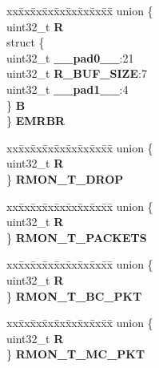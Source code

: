 \begin{DoxyCompactItemize}
\begin{tabbing}
\end{tabbing}\item 
\mbox{\label{structFEC__tag_a793aa6e26c1764363fe55c0d1cafb45c}} 
\begin{tabbing}
xx\=xx\=xx\=xx\=xx\=xx\=xx\=xx\=xx\=\kill
union \{\\
\>uint32\_t {\bfseries R}\\
\>struct \{\\
\>\>uint32\_t {\bfseries \_\_pad0\_\_}:21\\
\>\>uint32\_t {\bfseries R\_BUF\_SIZE}:7\\
\>\>uint32\_t {\bfseries \_\_pad1\_\_}:4\\
\>\} {\bfseries B}\\
\} {\bfseries EMRBR}\\

\end{tabbing}\item 
\mbox{\label{structFEC__tag_ac0c74b31f003377594c2c484a718315f}} 
\begin{tabbing}
xx\=xx\=xx\=xx\=xx\=xx\=xx\=xx\=xx\=\kill
union \{\\
\>uint32\_t {\bfseries R}\\
\} {\bfseries RMON\_T\_DROP}\\

\end{tabbing}\item 
\mbox{\label{structFEC__tag_a41cbe14c0586dc01889280dc240ae2cc}} 
\begin{tabbing}
xx\=xx\=xx\=xx\=xx\=xx\=xx\=xx\=xx\=\kill
union \{\\
\>uint32\_t {\bfseries R}\\
\} {\bfseries RMON\_T\_PACKETS}\\

\end{tabbing}\item 
\mbox{\label{structFEC__tag_a06baf6ffb8bff449b7af48b806d427b1}} 
\begin{tabbing}
xx\=xx\=xx\=xx\=xx\=xx\=xx\=xx\=xx\=\kill
union \{\\
\>uint32\_t {\bfseries R}\\
\} {\bfseries RMON\_T\_BC\_PKT}\\

\end{tabbing}\item 
\mbox{\label{structFEC__tag_aff7d36ee0e6a657df07093007e069b55}} 
\begin{tabbing}
xx\=xx\=xx\=xx\=xx\=xx\=xx\=xx\=xx\=\kill
union \{\\
\>uint32\_t {\bfseries R}\\
\} {\bfseries RMON\_T\_MC\_PKT}\\


\end{tabbing}
\end{DoxyCompactItemize}
